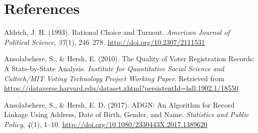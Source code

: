 \documentclass[12pt,twoside]{reedthesis}
\begin{document}
\begin{Shaded}
\begin{Highlighting}[]
   \OperatorTok{:}
  \StringTok{ }\NormalTok{ (}\NormalTok{)}
  \StringTok{ }\NormalTok{ (}\NormalTok{, }\NormalTok{, }\OperatorTok{$}
  \StringTok{ }\NormalTok{ (}\NormalTok{, }\NormalTok{, }\OperatorTok{$}
     \OperatorTok{:}
  \StringTok{ }\NormalTok{ ()}
  \StringTok{ }\NormalTok{ ()}
  \StringTok{ }\NormalTok{ ()}
  \StringTok{ }\NormalTok{ ()}
  \StringTok{ }
  \NormalTok{  \}}
  \NormalTok{\}}
  \end{Highlighting}
  \end{Shaded}
  
  \backmatter
  
  \chapter{References}\label{references}
  
  \noindent
  
  \setlength{\parindent}{-0.20in} \setlength{\leftskip}{0.20in}
  \setlength{\parskip}{8pt}
  
  \hypertarget{refs}{}
  \hypertarget{ref-aldrich_rational_1993}{}
  Aldrich, J. H. (1993). Rational Choice and Turnout. \emph{American
  Journal of Political Science}, \emph{37}(1), 246--278.
  \url{http://doi.org/10.2307/2111531}
  
  \hypertarget{ref-ansolabehere_quality_2010}{}
  Ansolabehere, S., \& Hersh, E. (2010). The Quality of Voter Registration
  Records: A State-by-State Analysis. \emph{Institute for Quantitative
  Social Science and Caltech/MIT Voting Technology Project Working Paper}.
  Retrieved from
  \url{https://dataverse.harvard.edu/dataset.xhtml?persistentId=hdl:1902.1/18550}
  
  \hypertarget{ref-ansolabehere_adgn:_2017}{}
  Ansolabehere, S., \& Hersh, E. D. (2017). ADGN: An Algorithm for Record
  Linkage Using Address, Date of Birth, Gender, and Name. \emph{Statistics
  and Public Policy}, \emph{4}(1), 1--10.
  \url{http://doi.org/10.1080/2330443X.2017.1389620}
  
\end{document}

